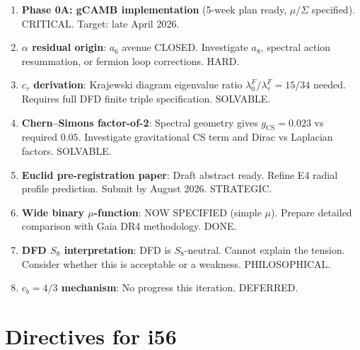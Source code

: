 \documentclass[11pt,a4paper]{article}
\begin{document}
\begin{enumerate}[label=\textbf{P\arabic*.}]
\item \textbf{Phase 0A: gCAMB implementation} (5-week plan ready, $\mu/\Sigma$ specified). CRITICAL. Target: late April 2026.
\item \textbf{$\alpha$ residual origin}: $a_6$ avenue CLOSED. Investigate $a_8$, spectral action resummation, or fermion loop corrections. HARD.
\item \textbf{$c_\tau$ derivation}: Krajewski diagram eigenvalue ratio $\lambda_0^F/\lambda_\tau^F = 15/34$ needed. Requires full DFD finite triple specification. SOLVABLE.
\item \textbf{Chern--Simons factor-of-2}: Spectral geometry gives $g_{\mathrm{CS}} = 0.023$ vs required $0.05$. Investigate gravitational CS term and Dirac vs Laplacian factors. SOLVABLE.
\item \textbf{Euclid pre-registration paper}: Draft abstract ready. Refine E4 radial profile prediction. Submit by August 2026. STRATEGIC.
\item \textbf{Wide binary $\mu$-function}: NOW SPECIFIED (simple $\mu$). Prepare detailed comparison with Gaia DR4 methodology. DONE.
\item \textbf{DFD $S_8$ interpretation}: DFD is $S_8$-neutral. Cannot explain the tension. Consider whether this is acceptable or a weakness. PHILOSOPHICAL.
\item \textbf{$c_b = 4/3$ mechanism}: No progress this iteration. DEFERRED.
\end{enumerate}


\section{Directives for i56}
\label{sec:directives}
\end{document}
